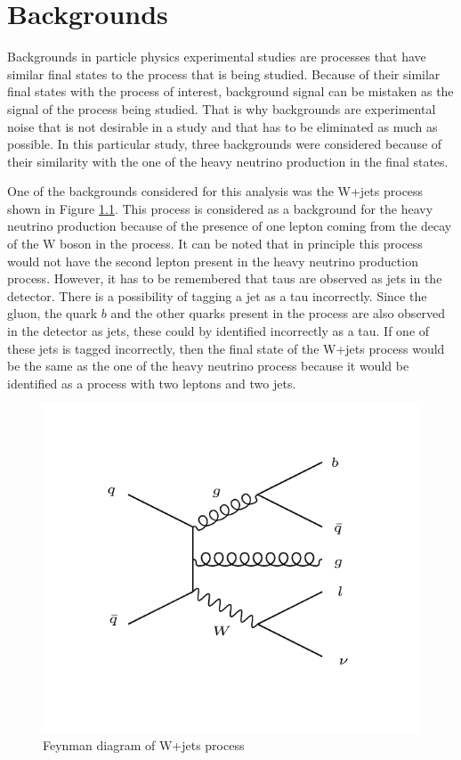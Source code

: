 \graphicspath{{Backgrounds/Figures/}}

\chapter{Backgrounds}\label{chapter: backgrounds}

Backgrounds in particle physics experimental studies are processes that have similar final states to the process that is being studied. Because of their similar final states with the process of interest, background signal can be mistaken as the signal of the process being studied. That is why backgrounds are experimental noise that is not desirable in a study and that has to be eliminated as much as possible. In this particular study, three backgrounds were considered because of their similarity with the one of the heavy neutrino production in the final states. 

One of the backgrounds considered for this analysis was the W+jets process shown in Figure \ref{fig: Wjets_background}. This process is considered as a background for the heavy neutrino production because of the presence of one lepton coming from the decay of the W boson in the process. It can be noted that in principle this process would not have the second lepton present in the heavy neutrino production process. However, it has to be remembered that taus are observed as jets in the detector. There is a possibility of tagging a jet as a tau incorrectly. Since the gluon, the quark $b$ and the other quarks present in the process are also observed in the detector as jets, these could by identified incorrectly as a tau. If one of these jets is tagged incorrectly, then the final state of the W+jets process would be the same as the one of the heavy neutrino process because it would be identified as a process with two leptons and two jets. 

\begin{figure}[H]
\centering
\includegraphics[width = \linewidth]{Wjets}
\caption{Feynman diagram of W+jets process}
\label{fig: Wjets_background}
\end{figure}



